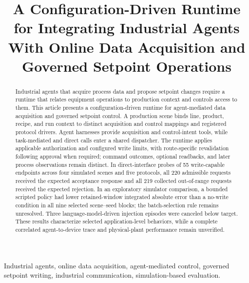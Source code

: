 \documentclass[journal]{IEEEtran}
\begin{document}

\title{A Configuration-Driven Runtime for Integrating Industrial Agents With Online Data Acquisition and Governed Setpoint Operations}

\author{}

\maketitle

\begin{abstract}
Industrial agents that acquire process data and propose setpoint changes require a runtime that relates equipment operations to production context and controls access to them. This article presents a configuration-driven runtime for agent-mediated data acquisition and governed setpoint control. A production scene binds line, product, recipe, and run context to distinct acquisition and control mappings and registered protocol drivers. Agent harnesses provide acquisition and control-intent tools, while task-mediated and direct calls enter a shared dispatcher. The runtime applies applicable authorization and configured write limits, with route-specific revalidation following approval when required; command outcomes, optional readbacks, and later process observations remain distinct. In direct-interface probes of 55 write-capable endpoints across four simulated scenes and five protocols, all 220 admissible requests received the expected acceptance response and all 219 collected out-of-range requests received the expected rejection. In an exploratory simulator comparison, a bounded scripted policy had lower retained-window integrated absolute error than a no-write condition in all nine selected scene--seed blocks; the batch-selection rule remains unresolved. Three language-model-driven injection episodes were canceled below target. These results characterize selected application-level behaviors, while a complete correlated agent-to-device trace and physical-plant performance remain unverified.
\end{abstract}

\begin{IEEEkeywords}
Industrial agents, online data acquisition, agent-mediated control, governed setpoint writing, industrial communication, simulation-based evaluation.
\end{IEEEkeywords}

\IEEEpeerreviewmaketitle
\end{document}
